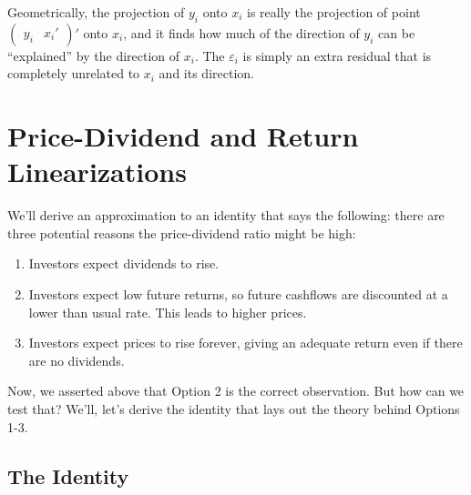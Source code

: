 \documentclass[12pt]{article}
\theoremstyle{plain}
\theoremstyle{definition}
\theoremstyle{remark}
\begin{document}
Geometrically, the projection of $y_i$ onto $x_i$ is really the
projection of point $\begin{pmatrix}y_i & x_i'\end{pmatrix}'$ onto
$x_i$, and it finds how much of the direction of $y_i$ can be
``explained'' by the direction of $x_i$. The $\varepsilon_i$ is simply
an extra residual that is completely unrelated to $x_i$ and its
direction.




\section{Price-Dividend and Return Linearizations}

We'll derive an approximation to an identity that says the following:
there are three potential reasons the price-dividend ratio might be
high:
\begin{enumerate}
    \item Investors expect dividends to rise.
    \item Investors expect low future returns, so future cashflows
	are discounted at a lower than usual rate. This leads
	to higher prices.
    \item Investors expect prices to rise forever, giving an
	adequate return even if there are no dividends.
\end{enumerate}
Now, we asserted above that Option 2 is the correct observation.
But how can we test that?  We'll, let's derive the identity that
lays out the theory behind Options 1-3.

\subsection{The Identity}
\end{document}
